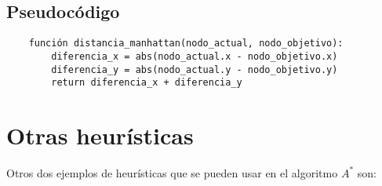\subsection*{Pseudocódigo}

\begin{verbatim}
    función distancia_manhattan(nodo_actual, nodo_objetivo):
        diferencia_x = abs(nodo_actual.x - nodo_objetivo.x)
        diferencia_y = abs(nodo_actual.y - nodo_objetivo.y)
        return diferencia_x + diferencia_y
    \end{verbatim}

\section{Otras heurísticas}

Otros dos ejemplos de heurísticas que se pueden usar en el algoritmo $A^{*}$ son:

